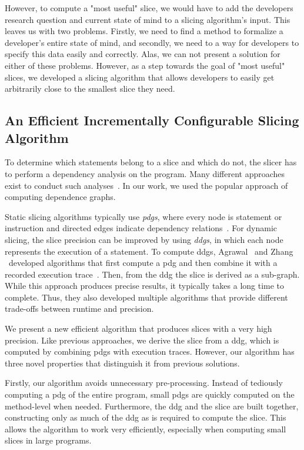 However, to compute a "most useful" slice, we would have to add the developers research question and current state of mind to a slicing algorithm's input.
This leaves us with two problems.
Firstly, we need to find a method to formalize a developer's entire state of mind, and secondly, we need to a way for developers to specify this data easily and correctly.
Alas, we can not present a solution for either of these problems.
However, as a step towards the goal of "most useful" slices, we developed a slicing algorithm that allows developers to easily get arbitrarily close to the smallest slice they need.

\subsection{An Efficient Incrementally Configurable Slicing Algorithm}

To determine which statements belong to a slice and which do not, the slicer has to perform a dependency analysis on the program.
Many different approaches exist to conduct such analyses~\cite{korel_98_dynamic_program_slicing_methods, tip_94_a_survey_of_program}. 
In our work, we used the popular approach of computing dependence graphs.

Static slicing algorithms typically use \emph{\acp{pdg}}, where every node is statement or instruction and directed edges indicate dependency relations~\cite{weiser_81_program_slicing}.
For dynamic slicing, the slice precision can be improved by using \emph{\acp{ddg}}, in which each node represents the execution of a statement.
To compute \acp{ddg}, Agrawal \etal\ and Zhang \etal\ developed algorithms that first compute a \ac{pdg} and then combine it with a recorded execution trace~\cite{agrawal_90_dynamic_program_slicing,zhang_03_precise_dynamic_slicing_algorithms}.
Then, from the \ac{ddg} the slice is derived as a sub-graph.
While this approach produces precise results, it typically takes a long time to complete.
Thus, they also developed multiple algorithms that provide different trade-offs between runtime and precision.

We present a new efficient algorithm that produces slices with a very high precision.
Like previous approaches, we derive the slice from a \ac{ddg}, which is computed by combining \acp{pdg} with execution traces.
However, our algorithm has three novel properties that distinguish it from previous solutions.

Firstly, our algorithm avoids unnecessary pre-processing.
Instead of tediously computing a \ac{pdg} of the entire program, small \acp{pdg} are quickly computed on the method-level when needed.
Furthermore, the \ac{ddg} and the slice are built together, constructing only as much of the \ac{ddg} as is required to compute the slice.
This allows the algorithm to work very efficiently, especially when computing small slices in large programs.

